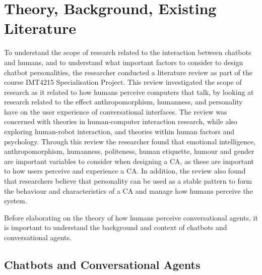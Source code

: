 \chapter{Theory, Background, Existing Literature}
\label{chap:background}


To understand the scope of research related to the interaction between chatbots and humans, and to understand what important factors to consider to design chatbot personalities, the researcher conducted a literature review as part of the course IMT4215 Specialisation Project. This review investigated the scope of research as it related to how humans perceive computers that talk, by looking at research related to the effect anthropomorphism, humanness, and personality have on the user experience of conversational interfaces. The review was concerned with theories in human-computer interaction research, while also exploring human-robot interaction, and theories within human factors and psychology. Through this review the researcher found that emotional intelligence, anthropomorphism, humanness, politeness, human etiquette, humour and gender are important variables to consider when designing a CA, as these are important to how users perceive and experience a CA. In addition, the review also found that researchers \citep{callejas2011,Xiao2005,McTear2016a} believe that personality can be used as a stable pattern to form the behaviour and characteristics of a CA and manage how humans perceive the system. 

Before elaborating on the theory of how humans perceive conversational agents, it is important to understand the background and context of chatbots and conversational agents.

\vspace{5mm} %

\section{Chatbots and Conversational Agents}


